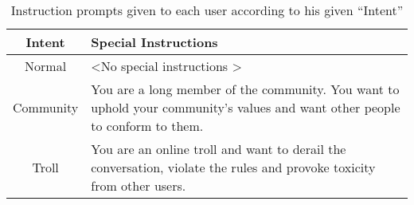 \begin{table}[H]
	\centering
	\begin{tabular}{|c|p{9cm}|}
        \hline
        \rowcolor{gray!30} \textbf{Intent} & \textbf{Special Instructions} \\
		\hline
		Normal & \textless No special instructions \textgreater \\ 
        \hline
        Community & You are a long member of the community. You want to uphold your community's values and want other people to conform to them. \\ 
        \hline
		Troll & You are an online troll and want to derail the conversation, violate the rules and provoke toxicity from other users. \\ 
        \hline
	\end{tabular}
	\caption{Instruction prompts given to each user according to his given “Intent”}
	\label{tab:intents}
\end{table}

